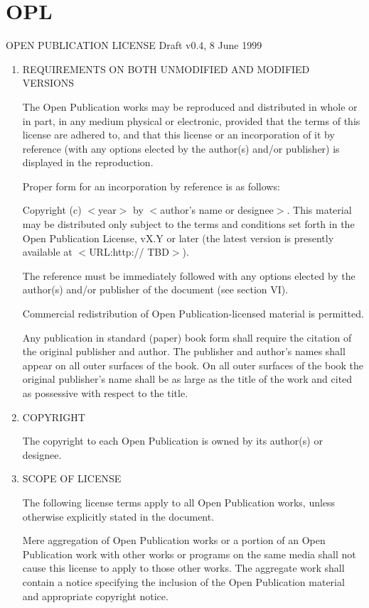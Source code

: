 \chapter{OPL}

 	

OPEN PUBLICATION LICENSE  Draft v0.4, 8 June 1999

\renewcommand{\labelenumi}{\Roman{enumi}.}
\begin{enumerate}
\item REQUIREMENTS ON BOTH UNMODIFIED AND MODIFIED VERSIONS

The Open Publication works may be reproduced and distributed in whole or
in part, in any medium physical or electronic, provided that the terms
of this license are adhered to, and that this license or an
incorporation of it by reference (with any options elected by the
author(s) and/or publisher) is displayed in the reproduction.

Proper form for an incorporation by reference is as follows:

Copyright (c) $<$year$>$ by $<$author's name or designee$>$.  This material may
be distributed only subject to the terms and conditions set forth in the
Open Publication License, vX.Y or later (the latest version is presently
available at $<$URL:http:// TBD$>$).

The reference must be immediately followed with any options elected by
the author(s) and/or publisher of the document (see section VI).

Commercial redistribution of Open Publication-licensed material is
permitted.

Any publication in standard (paper) book form shall require the citation
of the original publisher and author. The publisher and author's names
shall appear on all outer surfaces of the book.  On all outer surfaces
of the book the original publisher's name shall be as large as the title
of the work and cited as possessive with respect to the title.


\item COPYRIGHT


The copyright to each Open Publication is owned by its author(s) or
designee.

\item SCOPE OF LICENSE

The following license terms apply to all Open Publication works, unless
otherwise explicitly stated in the document.

Mere aggregation of Open Publication works or a portion of an Open
Publication work with other works or programs on the same media shall
not cause this license to apply to those other works. The aggregate work
shall contain a notice specifying the inclusion of the Open Publication
material and appropriate copyright notice.


\end{enumerate}
